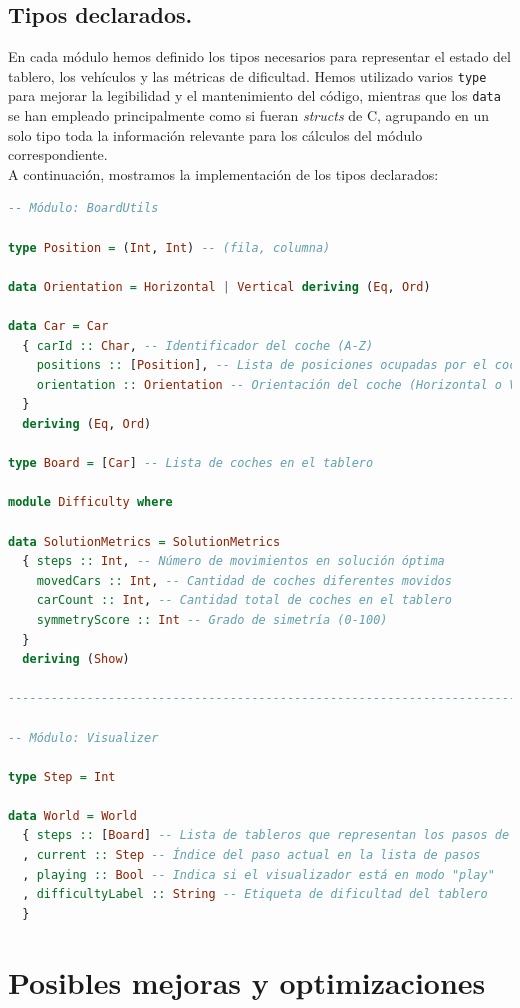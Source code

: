 \documentclass{article}
\begin{document}
\subsection{Tipos declarados.}

En cada módulo hemos definido los tipos necesarios para representar el estado del tablero, los vehículos y las métricas de dificultad. Hemos utilizado varios \texttt{type} para mejorar la legibilidad y el mantenimiento del código, mientras que los \texttt{data} se han empleado principalmente como si fueran \emph{structs} de C, agrupando en un solo tipo toda la información relevante para los cálculos del módulo correspondiente.\\

A continuación, mostramos la implementación de los tipos declarados:
\begin{lstlisting}[language=Haskell]
-- Módulo: BoardUtils

type Position = (Int, Int) -- (fila, columna)

data Orientation = Horizontal | Vertical deriving (Eq, Ord)

data Car = Car
  { carId :: Char, -- Identificador del coche (A-Z)
    positions :: [Position], -- Lista de posiciones ocupadas por el coche
    orientation :: Orientation -- Orientación del coche (Horizontal o Vertical)
  }
  deriving (Eq, Ord)

type Board = [Car] -- Lista de coches en el tablero

module Difficulty where

data SolutionMetrics = SolutionMetrics
  { steps :: Int, -- Número de movimientos en solución óptima
    movedCars :: Int, -- Cantidad de coches diferentes movidos
    carCount :: Int, -- Cantidad total de coches en el tablero
    symmetryScore :: Int -- Grado de simetría (0-100)
  }
  deriving (Show)

---------------------------------------------------------------------------

-- Módulo: Visualizer

type Step = Int

data World = World
  { steps :: [Board] -- Lista de tableros que representan los pasos de la solución
  , current :: Step -- Índice del paso actual en la lista de pasos
  , playing :: Bool -- Indica si el visualizador está en modo "play"
  , difficultyLabel :: String -- Etiqueta de dificultad del tablero
  }
\end{lstlisting}

\newpage
\section{Posibles mejoras y optimizaciones}
\end{document}

